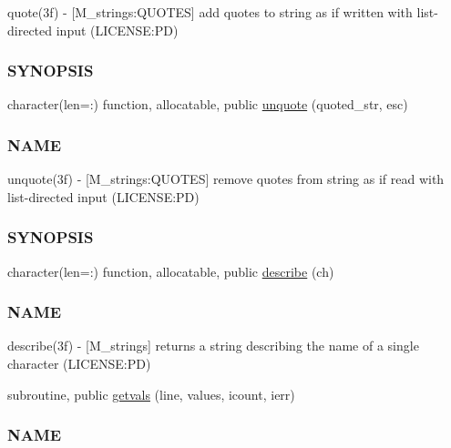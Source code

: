 \begin{DoxyCompactItemize}
\begin{DoxyCompactList}
quote(3f) -\/ \mbox{[}M\+\_\+strings\+:Q\+U\+O\+T\+ES\mbox{]} add quotes to string as if written with list-\/directed input (L\+I\+C\+E\+N\+SE\+:PD) \subsubsection*{S\+Y\+N\+O\+P\+S\+IS}\end{DoxyCompactList}\item 
character(len=\+:) function, allocatable, public \mbox{\hyperlink{namespacem__strings_acb88c65d5df2d5b3e55df2d2dab57390}{unquote}} (quoted\+\_\+str, esc)
\begin{DoxyCompactList}\small\item\em \subsubsection*{N\+A\+ME}

unquote(3f) -\/ \mbox{[}M\+\_\+strings\+:Q\+U\+O\+T\+ES\mbox{]} remove quotes from string as if read with list-\/directed input (L\+I\+C\+E\+N\+SE\+:PD) \subsubsection*{S\+Y\+N\+O\+P\+S\+IS}\end{DoxyCompactList}\item 
character(len=\+:) function, allocatable, public \mbox{\hyperlink{namespacem__strings_a8d7007f0c34d7db4c004dac56e609b3f}{describe}} (ch)
\begin{DoxyCompactList}\small\item\em \subsubsection*{N\+A\+ME}

describe(3f) -\/ \mbox{[}M\+\_\+strings\mbox{]} returns a string describing the name of a single character (L\+I\+C\+E\+N\+SE\+:PD) \end{DoxyCompactList}\item 
subroutine, public \mbox{\hyperlink{namespacem__strings_abf6c760f5d15a306bd252337d0a5ba4d}{getvals}} (line, values, icount, ierr)
\begin{DoxyCompactList}\small\item\em \subsubsection*{N\+A\+ME}


\end{DoxyCompactList}
\end{DoxyCompactItemize}
